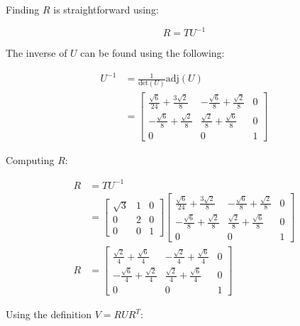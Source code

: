 Finding $R$ is straightforward using:

$$
R=TU^{-1}
$$

The inverse of $U$ can be found using the following:

\begin{align*}
U^{-1}&=\frac{1}{\text{det}(U)}\text{adj}(U)\\[10pt]
&=\begin{bmatrix}
\frac{\sqrt{ 6 }}{24}+\frac{3\sqrt{ 2 }}{8} & -\frac{\sqrt{ 6 }}{8}+\frac{\sqrt{ 2 }}{8} & 0 \\
-\frac{\sqrt{ 6 }}{8}+\frac{\sqrt{ 2 }}{8} & \frac{\sqrt{ 2 }}{8}+\frac{\sqrt{ 6 }}{8} & 0 \\
0 & 0 & 1
\end{bmatrix}
\end{align*}

Computing $R$:

\begin{align*}
R&=TU^{-1}\\[10pt]
&= \begin{bmatrix}
\sqrt{ 3 } & 1 & 0 \\
0 & 2 & 0 \\
0 & 0 & 1
\end{bmatrix}\begin{bmatrix}
\frac{\sqrt{ 6 }}{24}+\frac{3\sqrt{ 2 }}{8} & -\frac{\sqrt{ 6 }}{8}+\frac{\sqrt{ 2 }}{8} & 0 \\
-\frac{\sqrt{ 6 }}{8}+\frac{\sqrt{ 2 }}{8} & \frac{\sqrt{ 2 }}{8}+\frac{\sqrt{ 6 }}{8} & 0 \\
0 & 0 & 1
\end{bmatrix}\\[10pt]
R&=\begin{bmatrix}
\frac{\sqrt{ 2 }}{4}+\frac{\sqrt{ 6 }}{4} & -\frac{\sqrt{ 2 }}{4}+\frac{\sqrt{ 6 }}{4} & 0 \\
-\frac{\sqrt{ 6 }}{4}+\frac{\sqrt{ 2 }}{4} & \frac{\sqrt{ 2 }}{4}+\frac{\sqrt{ 6 }}{4} & 0 \\
0 & 0 & 1
\end{bmatrix}
\end{align*}

Using the definition $V=RUR^T$:

